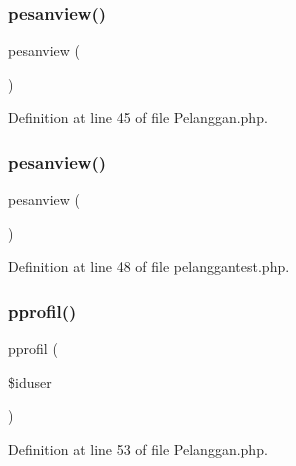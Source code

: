 \subsubsection{\texorpdfstring{pesanview()}{pesanview()}\hspace{0.1cm}{\footnotesize\ttfamily [1/2]}}
{\footnotesize\ttfamily pesanview (\begin{DoxyParamCaption}{ }\end{DoxyParamCaption})}



Definition at line 45 of file Pelanggan.\+php.

\mbox{\label{class_pelanggan_a2184e0cd904ece2a3390ff342aedfeef}} 
\subsubsection{\texorpdfstring{pesanview()}{pesanview()}\hspace{0.1cm}{\footnotesize\ttfamily [2/2]}}
{\footnotesize\ttfamily pesanview (\begin{DoxyParamCaption}{ }\end{DoxyParamCaption})}



Definition at line 48 of file pelanggantest.\+php.

\mbox{\label{class_pelanggan_a656de37894005c0bcc616041b8e57648}} 
\subsubsection{\texorpdfstring{pprofil()}{pprofil()}\hspace{0.1cm}{\footnotesize\ttfamily [1/2]}}
{\footnotesize\ttfamily pprofil (\begin{DoxyParamCaption}\item[{}]{\$iduser }\end{DoxyParamCaption})}



Definition at line 53 of file Pelanggan.\+php.

\mbox{\label{class_pelanggan_a656de37894005c0bcc616041b8e57648}} 
